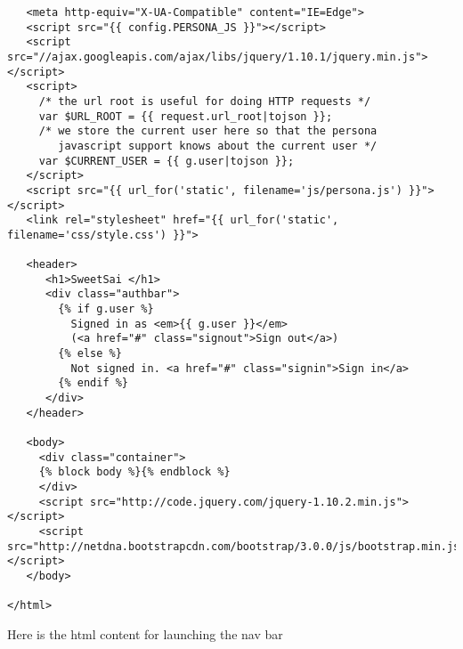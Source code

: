 \documentclass[11pt]{article}
\begin{document}
\begin{verbatim}
   <meta http-equiv="X-UA-Compatible" content="IE=Edge">
   <script src="{{ config.PERSONA_JS }}"></script>
   <script src="//ajax.googleapis.com/ajax/libs/jquery/1.10.1/jquery.min.js"></script>
   <script>
     /* the url root is useful for doing HTTP requests */
     var $URL_ROOT = {{ request.url_root|tojson }};
     /* we store the current user here so that the persona
        javascript support knows about the current user */
     var $CURRENT_USER = {{ g.user|tojson }};
   </script>
   <script src="{{ url_for('static', filename='js/persona.js') }}"></script>
   <link rel="stylesheet" href="{{ url_for('static', filename='css/style.css') }}">  

   <header>
      <h1>SweetSai </h1>
      <div class="authbar">
        {% if g.user %}
          Signed in as <em>{{ g.user }}</em>
          (<a href="#" class="signout">Sign out</a>)
        {% else %}
          Not signed in. <a href="#" class="signin">Sign in</a>
        {% endif %}
      </div>
   </header>

   <body>
     <div class="container">
     {% block body %}{% endblock %}
     </div>
     <script src="http://code.jquery.com/jquery-1.10.2.min.js"></script>
     <script src="http://netdna.bootstrapcdn.com/bootstrap/3.0.0/js/bootstrap.min.js"></script>
   </body>

</html>
\end{verbatim}

Here is the html content for launching the nav bar
\end{document}
